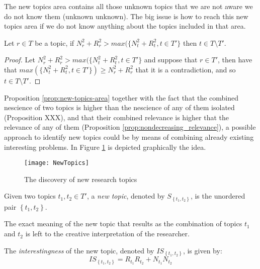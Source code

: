 The new topics area contains all those unknown topics that we are not aware we do not know them (unknown unknown). The big issue is how to reach this new topics area if we do not know anything about the topics included in that area.

\begin{proposition}
\label{prop:new-topics-area}
Let $r \in T$ be a topic, if  $N^2_{r} + R^2_{r} > max(\{N^2_{t} + R^2_{t}, t \in T'\}$ then $t \in T \setminus T'$.
\end{proposition}
\begin{proof}
Let $N^2_{r} + R^2_{r} > max(\{N^2_{t} + R^2_{t}, t \in T'\}$ and suppose that $r \in T'$, then have that $max(\{N^2_{t} + R^2_{t}, t \in T'\}) \geq N^2_{r} + R^2_{r}$ that it is a contradiction, and so $t \in T \setminus T'$.
\end{proof}

Proposition \ref{prop:new-topics-area} together with the fact that the combined nescience of two topics is higher than the nescience of any of them isolated (Proposition {\color{red} XXX}), and that their combined relevance is higher that the relevance of any of them (Proposition \ref{prop:nondecreasing_relevance}), a possible approach to identify new topics could be by means of combining already existing interesting problems. In Figure \ref{fig:New-Topics} is depicted graphically the idea.

\begin{figure}[h]
\centering\texttt{[image: NewTopics]}
\caption{\label{fig:New-Topics}The discovery of new research topics}
\end{figure}

\begin{definition}
Given two topics $t_{1}, t_{2} \in T'$, a \emph{new topic}, denoted by $S_{\left\{ t_{1},t_{2}\right\}}$, is the unordered pair $\left\{ t_{1},t_{2}\right\}$.
\end{definition}

The exact meaning of the new topic that results as the combination of topics $t_{1}$ and $t_{2}$ is left to the creative interpretation of the researcher.

\begin{definition}
The \emph{interestingness} of the new topic, denoted by $IS_{\left\{ t_{1},t_{2}\right\} }$, is given by:
\[
IS_{\left\{ t_{1},t_{2}\right\} } = R_{t_{1}}R_{t_{2}}+N_{t_{1}}N_{t_{2}}
\]
\end{definition}

